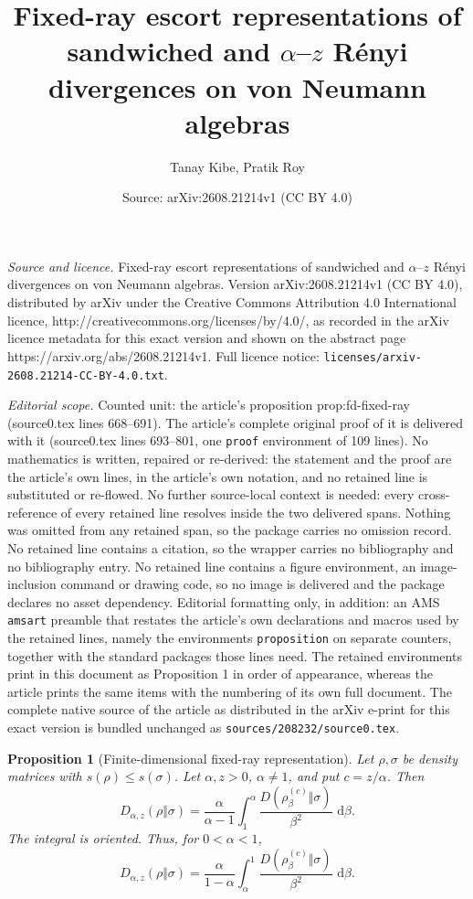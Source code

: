 \documentclass[10pt,a4paper]{amsart}
\title{Fixed-ray escort representations of sandwiched and $\alpha$--$z$ R\'enyi divergences on von Neumann algebras}
\author{Tanay Kibe, Pratik Roy}
\date{Source: arXiv:2608.21214v1 (CC BY 4.0)}
\newtheorem{proposition}{Proposition}
\newcommand{\dd}{\,\mathrm d}
\begin{document}
\maketitle

\noindent\emph{Source and licence.} Fixed-ray escort representations of sandwiched and $\alpha$--$z$ R\'enyi divergences on von Neumann algebras. Version arXiv:2608.21214v1 (CC BY 4.0), distributed by arXiv under the Creative Commons Attribution 4.0 International licence, http://creativecommons.org/licenses/by/4.0/, as recorded in the arXiv licence metadata for this exact version and shown on the abstract page https://arxiv.org/abs/2608.21214v1. Full licence notice: \texttt{licenses/arxiv-2608.21214-CC-BY-4.0.txt}.\par\smallskip

\noindent\textit{Editorial scope.} Counted unit: the article's proposition prop:fd-fixed-ray (source0.tex lines 668--691). The article's complete original proof of it is delivered with it (source0.tex lines 693--801, one \texttt{proof} environment of 109 lines). No mathematics is written, repaired or re-derived: the statement and the proof are the article's own lines, in the article's own notation, and no retained line is substituted or re-flowed.  No further source-local context is needed: every cross-reference of every retained line resolves inside the two delivered spans.  Nothing was omitted from any retained span, so the package carries no omission record.  No retained line contains a citation, so the wrapper carries no bibliography and no bibliography entry.  No retained line contains a figure environment, an image-inclusion command or drawing code, so no image is delivered and the package declares no asset dependency.  Editorial formatting only, in addition: an AMS \texttt{amsart} preamble that restates the article's own declarations and macros used by the retained lines, namely the environments \texttt{proposition} on separate counters, together with the standard packages those lines need.  The retained environments print in this document as Proposition 1 in order of appearance, whereas the article prints the same items with the numbering of its own full document.  The complete native source of the article as distributed in the arXiv e-print for this exact version is bundled unchanged as \texttt{sources/208232/source0.tex}.
\begin{proposition}[Finite-dimensional fixed-ray representation]
\label{prop:fd-fixed-ray}
Let $\rho,\sigma$ be density matrices with
$s(\rho)\leq s(\sigma)$.  Let $\alpha,z>0$, $\alpha\ne1$, and put
$c=z/\alpha$.
Then
\begin{equation}
  D_{\alpha,z}(\rho\Vert\sigma)
  =\frac{\alpha}{\alpha-1}
   \int_1^\alpha
   \frac{D(\rho_{\beta}^{(c)}\Vert\sigma)}{\beta^2}
   \,\dd\beta .
  \label{eq:fd-fixed-ray-integral}
\end{equation}
The integral is oriented.  Thus, for $0<\alpha<1$,
\begin{equation}
  D_{\alpha,z}(\rho\Vert\sigma)
  =\frac{\alpha}{1-\alpha}
   \int_\alpha^1
   \frac{D(\rho_{\beta}^{(c)}\Vert\sigma)}{\beta^2}
   \,\dd\beta .
  \label{eq:fd-fixed-ray-lower}
\end{equation}
\end{proposition}
\end{document}
